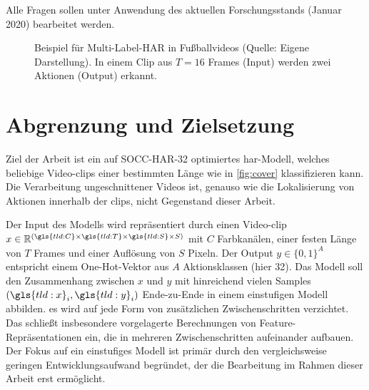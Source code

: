 Alle Fragen sollen unter Anwendung des aktuellen Forschungsstands (Januar 2020) bearbeitet werden.

\begin{figure}[htbp]
    \centering


    \caption[Beispiel für Multi-Label-HAR in Fußballvideos]{Beispiel für Multi-Label-HAR in Fußballvideos (Quelle: Eigene Darstellung). In einem Clip aus $T=16$ Frames (Input) werden zwei Aktionen (Output) erkannt.}
    \label{fig:cover}
\end{figure}

\section{Abgrenzung und Zielsetzung}
\label{sec:zielsetzung}

Ziel der Arbeit ist ein auf SOCC-HAR-32 optimiertes \gls{har}-Modell, welches beliebige Video-\glspl{clip} einer bestimmten Länge wie in \autoref{fig:cover} klassifizieren kann.
Die Verarbeitung ungeschnittener Videos ist, genauso wie die Lokalisierung von Aktionen innerhalb der \glspl{clip}, nicht Gegenstand dieser Arbeit.

Der Input des Modells wird repräsentiert durch einen Video-\gls{clip} $x \in \mathbb{R}^{(\gls{tld:C} \times \gls{tld:T} \times \gls{tld:S} \times S)}$ mit $C$ Farbkanälen, einer festen Länge von $T$ Frames und einer Auflösung von $S$ Pixeln.
Der Output $y \in \{0, 1\}^A$ entspricht einem One-Hot-Vektor aus $A$ Aktionsklassen (hier 32).
Das Modell soll den Zusammenhang zwischen $x$ und $y$ mit hinreichend vielen Samples $(\gls{tld:x}_i, \gls{tld:y}_i)$ Ende-zu-Ende in einem einstufigen Modell abbilden.
\Dh es wird auf jede Form von zusätzlichen Zwischenschritten verzichtet.
Das schließt insbesondere vorgelagerte Berechnungen von Feature-Repräsentationen ein, die in mehreren Zwischenschritten aufeinander aufbauen.
Der Fokus auf ein einstufiges Modell ist primär durch den vergleichsweise geringen Entwicklungsaufwand begründet, der die Bearbeitung im Rahmen dieser Arbeit erst ermöglicht.

